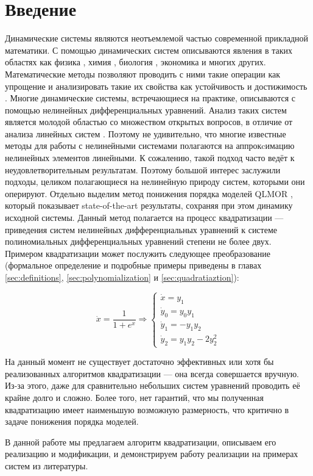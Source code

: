 
\section{Введение}

Динамические системы являются неотъемлемой частью современной прикладной математики. С помощью динамических систем описываются явления в таких областях как физика \cite{physics-example}, химия \cite{chemistry-example}, биология \cite{biology-example}, экономика \cite{economics-example} и многих других. Математические методы позволяют проводить с ними такие операции как упрощение \cite{MOR-book} и анализировать такие их свойства как устойчивость \cite{Strogatz-book} и достижимость \cite{Scott-reachability}. Многие динамические системы, встречающиеся на практике, описываются с помощью нелинейных дифференциальных уравнений. Анализ таких  систем является молодой областью со множеством открытых вопросов, в отличие от анализа линейных систем \cite{MOR-linear-overview}. Поэтому не удивительно, что многие известные методы для работы с нелинейными системами полагаются на аппрокcимацию нелинейных элементов линейными. К сожалению, такой подход часто ведёт к неудовлетворительным результатам. 
Поэтому большой интерес заслужили подходы, целиком полагающиеся на нелинейную природу систем, которыми они оперируют. 
Отдельно выделим метод понижения порядка моделей QLMOR \cite{Gu-PhD, Kramer-Willcox}, который показывает state-of-the-art результаты, сохраняя при этом динамику исходной системы. 
Данный метод полагается на процесс квадратизации --- приведения систем нелинейных дифференциальных уравнений к системе полиномиальных дифференциальных уравнений степени не более двух. 
Примером квадратизации может послужить следующее преобразование (формальное определение и подробные примеры приведены в главах \ref{sec:definitions}, \ref{sec:polynomialization} и \ref{sec:quadratiaztion}):

\[
     \dot x = \frac{1}{1 + e^x} 
\Longrightarrow
\begin{cases}
    \dot x = y_1 \\
    \dot y_0 = y_0 y_1 \\
    \dot y_1 = -y_1 y_2 \\
    \dot y_2 = y_1 y_2 - 2y_2^2
\end{cases}
\]

На данный момент не существует достаточно эффективных или хотя бы реализованных алгоритмов квадратизации --- она всегда совершается вручную.
Из-за этого, даже для сравнительно небольших систем уравнений проводить её крайне долго и сложно. 
Более того, нет гарантий, что мы полученная квадратизацию имеет наименьшую возможную размерность, что критично в задаче понижения порядка моделей. 

В данной работе мы предлагаем алгоритм квадратизации, описываем его реализацию и модификации, и демонстрируем работу реализации на примерах систем из литературы.